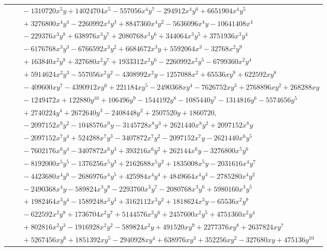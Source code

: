 \documentclass[11pt]{article}
\begin{document}
\begin{longtable}{@{}ll@{}}
 & $\quad -1310720x^{5}y+14024704x^{5}-557056x^{4}y^{7}-294912x^{4}y^{6}+6651904x^{4}y^{5}$\\
 & $\quad +3276800x^{4}y^{4}-2260992x^{4}y^{3}+8847360x^{4}y^{2}-5636096x^{4}y-10641408x^{4}$\\
 & $\quad -229376x^{3}y^{8}+638976x^{3}y^{7}+2080768x^{3}y^{6}+344064x^{3}y^{5}+3751936x^{3}y^{4}$\\
 & $\quad -6176768x^{3}y^{3}-6766592x^{3}y^{2}+6684672x^{3}y+5592064x^{3}-32768x^{2}y^{9}$\\
 & $\quad +163840x^{2}y^{8}+327680x^{2}y^{7}+1933312x^{2}y^{6}-2260992x^{2}y^{5}-6799360x^{2}y^{4}$\\
 & $\quad +5914624x^{2}y^{3}-557056x^{2}y^{2}-4308992x^{2}y-1257088x^{2}+65536xy^{9}+622592xy^{8}$\\
 & $\quad -409600xy^{7}-4390912xy^{6}+221184xy^{5}-2490368xy^{4}-7626752xy^{3}+2768896xy^{2}+268288xy$\\
 & $\quad -1249472x+122880y^{10}+106496y^{9}-1544192y^{8}-1085440y^{7}-1314816y^{6}-5574656y^{5}$\\
 & $\quad +2740224y^{4}+2672640y^{3}-2408448y^{2}+2507520y+1860720,$\\
 & $\quad -2097152x^{9}y^{2}-1048576x^{9}y-3145728x^{8}y^{3}+2621440x^{8}y^{2}+2097152x^{8}y$\\
 & $\quad -2097152x^{7}y^{4}+524288x^{7}y^{3}-3407872x^{7}y^{2}-2097152x^{7}y-2621440x^{6}y^{5}$\\
 & $\quad -7602176x^{6}y^{4}-3407872x^{6}y^{3}+393216x^{6}y^{2}+262144x^{6}y-3276800x^{5}y^{6}$\\
 & $\quad -8192000x^{5}y^{5}-1376256x^{5}y^{3}+2162688x^{5}y^{2}+1835008x^{5}y-2031616x^{4}y^{7}$\\
 & $\quad -4423680x^{4}y^{6}-2686976x^{4}y^{5}+425984x^{4}y^{4}+4849664x^{4}y^{3}-2785280x^{4}y^{2}$\\
 & $\quad -2490368x^{4}y-589824x^{3}y^{8}-2293760x^{3}y^{7}-2080768x^{3}y^{6}+5980160x^{3}y^{5}$\\
 & $\quad +1982464x^{3}y^{4}-1589248x^{3}y^{3}+3162112x^{3}y^{2}+1818624x^{3}y-65536x^{2}y^{9}$\\
 & $\quad -622592x^{2}y^{8}+1736704x^{2}y^{7}+5144576x^{2}y^{6}+2457600x^{2}y^{5}+4751360x^{2}y^{4}$\\
 & $\quad +802816x^{2}y^{3}-1916928x^{2}y^{2}-589824x^{2}y+491520xy^{9}+2277376xy^{8}+2637824xy^{7}$\\
 & $\quad +5267456xy^{6}+1851392xy^{5}-2940928xy^{4}+638976xy^{3}+352256xy^{2}-327680xy+475136y^{10}$\\

\end{longtable}
\end{document}
